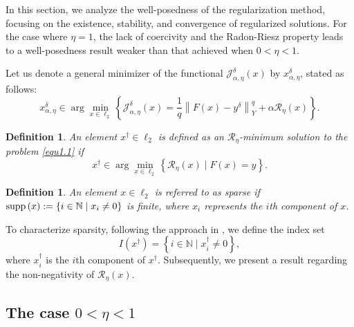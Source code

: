 \documentclass[a4paper,12pt]{article}
\newtheorem{definition}[theorem]{Definition}
\numberwithin{equation}{section}
\begin{document}
\par In this section, we analyze the well-posedness of the regularization method, focusing on the existence, stability, and convergence of regularized solutions. For the case where $\eta=1$, the lack of coercivity and the Radon-Riesz property leads to a well-posedness result weaker than that achieved when $0<\eta<1$.

\par Let us denote a general minimizer of the functional $\mathcal{J}_{\alpha,\eta}^{\delta}\left(x\right)$ by $x_{\alpha,\eta}^{\delta}$, stated as follows:
\begin{equation}\label{equ2.1}
    x_{\alpha,\eta}^{\delta}\in\arg\min_{x\in\ell_{2}}\left\{\mathcal{J}_{\alpha,\eta}^{\delta}\left(x\right) =\frac{1}{q}\left\|F\left(x\right)-y^{\delta}\right\|_{Y}^{q}+\alpha\mathcal{R}_{\eta} \left(x\right)\right\}.
\end{equation}

\begin{definition}\label{def2.1}
    An element $x^{\dagger}\in\ell_{2}$ is defined as an $\mathcal{R}_{\eta}$-minimum solution to the problem \eqref{equ1.1} if
    \begin{equation*}
        x^{\dagger}\in\arg\min_{x\in\ell_{2}}\left\{\mathcal{R}_{\eta}\left(x\right)\mid F\left(x\right)=y\right\}.
    \end{equation*}
\end{definition}

\begin{definition}\label{def2.2}
    An element $x\in\ell_{2}$ is referred to as sparse if ${\rm supp}\left(x\right):=\left\{i\in\mathbb{N} \mid x_{i}\neq 0 \right\}$ is finite, where $x_{i}$ represents the $i$th component of $x$.
\end{definition}

\par To characterize sparsity, following the approach in \cite{DDD04}, we define the index set
\begin{equation}\label{equ2.2}
    I\left(x^{\dagger}\right)=\left\{i\in\mathbb{N}\mid x_{i}^{\dagger}\neq0\right\},
\end{equation}
where $x_{i}^{\dagger}$ is the $i$th component of $x^{\dagger}$. Subsequently, we present a result regarding the non-negativity of $\mathcal{R}_{\eta}\left(x\right)$.


\subsection{The case $0<\eta<1$}\label{sec2.1}
\end{document}
